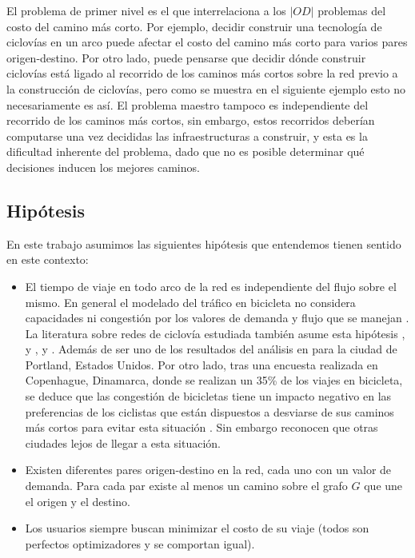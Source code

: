 \documentclass{article}
\begin{document}
  El problema de primer nivel es el que interrelaciona a los $|OD|$ problemas del costo del camino más corto. Por ejemplo, decidir construir una tecnología de ciclovías en un arco puede afectar el costo del camino más corto para varios pares origen-destino. Por otro lado, puede pensarse que decidir dónde construir ciclovías está ligado al recorrido de los caminos más cortos sobre la red previo a la construcción de ciclovías, pero como se muestra en el siguiente ejemplo esto no necesariamente es así. El problema maestro tampoco es independiente del recorrido de los caminos más cortos, sin embargo, estos recorridos deberían computarse una vez decididas las infraestructuras a construir, y esta es la dificultad inherente del problema, dado que no es posible determinar qué decisiones inducen los mejores caminos.

  \subsection{Hipótesis}

  En este trabajo asumimos las siguientes hipótesis que entendemos tienen sentido en este contexto:

  \begin{itemize}
    \item{El tiempo de viaje en todo arco de la red es independiente del flujo sobre el mismo. En general el modelado del tráfico en bicicleta no considera capacidades ni congestión por los valores de demanda y flujo que se manejan \cite{Sheffi1985}. La literatura sobre redes de ciclovía estudiada también asume esta hipótesis \cite{Lin2013}, \cite{Duthie2014} y \cite{liu2019}, \cite{Zhu2019} y \cite{baya2021}. Además de ser uno de los resultados del análisis en \cite{broach2012} para la ciudad de Portland, Estados Unidos. Por otro lado, tras una encuesta realizada en Copenhague, Dinamarca, donde se realizan un 35\% de los viajes en bicicleta, se deduce que las congestión de bicicletas tiene un impacto negativo en las preferencias de los ciclistas que están dispuestos a desviarse de sus caminos más cortos para evitar esta situación \cite{Vedel2017}. Sin embargo reconocen que otras ciudades lejos de llegar a esta situación.}
    \item{Existen diferentes pares origen-destino en la red, cada uno con un valor de demanda. Para cada par existe al menos un camino sobre el grafo $G$ que une el origen y el destino.}
    \item{Los usuarios siempre buscan minimizar el costo de su viaje (todos son perfectos optimizadores y se comportan igual).}
  \end{itemize}
\end{document}
